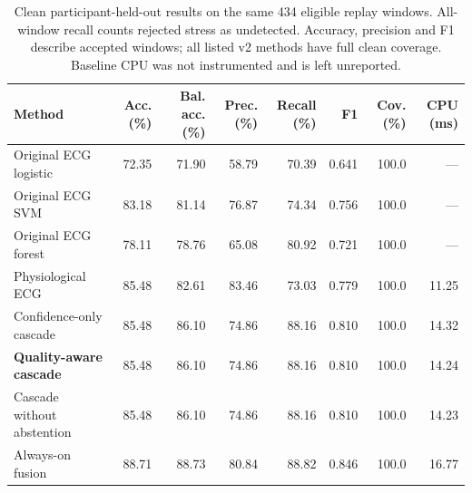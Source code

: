 \begin{table}[t]
\centering\caption{Clean participant-held-out results on the same 434 eligible replay windows. All-window recall counts rejected stress as undetected. Accuracy, precision and F1 describe accepted windows; all listed v2 methods have full clean coverage. Baseline CPU was not instrumented and is left unreported.}
\label{tab:clean}\small
\begin{tabular}{lrrrrrrr}\toprule
Method & Acc. (\%) & Bal. acc. (\%) & Prec. (\%) & Recall (\%) & F1 & Cov. (\%) & CPU (ms)\\\midrule
Original ECG logistic & 72.35 & 71.90 & 58.79 & 70.39 & 0.641 & 100.0 & ---\\
Original ECG SVM & 83.18 & 81.14 & 76.87 & 74.34 & 0.756 & 100.0 & ---\\
Original ECG forest & 78.11 & 78.76 & 65.08 & 80.92 & 0.721 & 100.0 & ---\\
Physiological ECG & 85.48 & 82.61 & 83.46 & 73.03 & 0.779 & 100.0 & 11.25\\
Confidence-only cascade & 85.48 & 86.10 & 74.86 & 88.16 & 0.810 & 100.0 & 14.32\\
\textbf{Quality-aware cascade} & 85.48 & 86.10 & 74.86 & 88.16 & 0.810 & 100.0 & 14.24\\
Cascade without abstention & 85.48 & 86.10 & 74.86 & 88.16 & 0.810 & 100.0 & 14.23\\
Always-on fusion & 88.71 & 88.73 & 80.84 & 88.82 & 0.846 & 100.0 & 16.77\\
\bottomrule\end{tabular}
\end{table}
